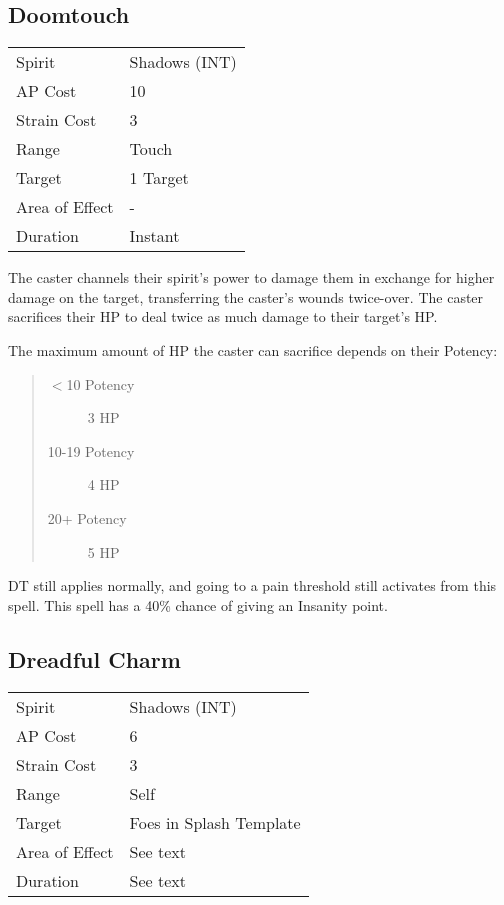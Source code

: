 \documentclass[11pt,a4paper,twocolumn]{book}
\begin{document}
\subsection*{Doomtouch}
{
	\begin{tabu} to 75mm{| X[l,4] | X[l,7] |}
		\hline
		Spirit         & Shadows (INT) \\
		AP Cost        & 10            \\
		Strain Cost    & 3             \\
		Range          & Touch         \\
		Target         & 1 Target      \\
		Area of Effect & -             \\
		Duration       & Instant       \\ \hline
	\end{tabu}
	
}

\medskip

The caster channels their spirit's power to damage them in exchange for higher damage on the target, transferring the caster's wounds twice-over. The caster sacrifices their HP to deal twice as much damage to their target's HP.

The maximum amount of HP the caster can sacrifice depends on their Potency:
\begin{quote}
	\begin{description}
		\item[$<$10 Potency] 	3 HP
		\item[10-19 Potency] 	4 HP
		\item[20+ Potency] 	5 HP
	\end{description}
\end{quote}

DT still applies normally, and going to a pain threshold still activates from this spell. This spell has a 40\% chance of giving an Insanity point.

\subsection*{Dreadful Charm}
{
	\begin{tabu} to 75mm{| X[l,4] | X[l,7] |}
		\hline
		Spirit 			&  Shadows (INT)\\
		AP Cost	      	&  6				\\
		Strain Cost     &  3			\\
		Range     		&  Self	\\
		Target      	&  Foes in Splash Template			\\
		Area of Effect  &  See text	 			\\
		Duration     	&  See text			\\ \hline
	\end{tabu}
	
}
\end{document}
